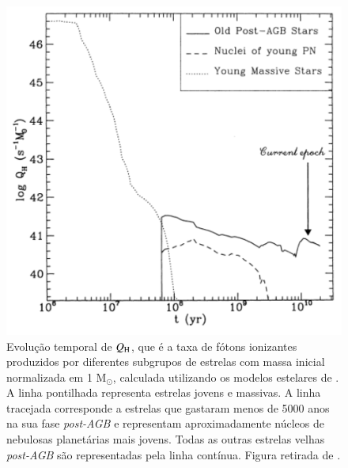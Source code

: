 \begin{figure}
	\centering
	\includegraphics[scale=0.7]{figuras/Binette1994Fig1.pdf}
	\caption[Evolução temporal de $Q_{\rm H}$]
	{Evolução temporal de $Q_{\rm H}$, que é a taxa de fótons ionizantes produzidos por diferentes subgrupos de estrelas com massa inicial normalizada em 1 M${}_{\odot}$, calculada utilizando os modelos estelares de \citet{BC93}. A linha pontilhada representa estrelas jovens e massivas. A linha tracejada corresponde a estrelas que gastaram menos de 5000 anos na sua fase {\em post-AGB} e representam aproximadamente núcleos de nebulosas planetárias mais jovens. Todas as outras estrelas velhas {\em post-AGB} são representadas pela linha contínua. Figura retirada de \citet{Binette.etal.1994a}.}
	\label{fig:Fig1Binette94}
\end{figure}

